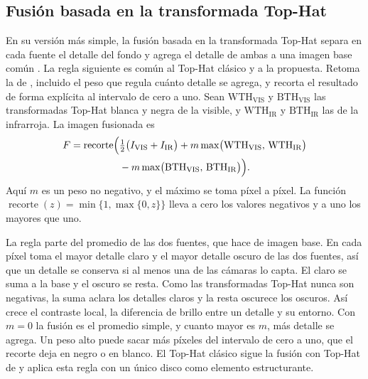 \subsection{Fusión basada en la transformada Top-Hat}
\label{sec:fusion-tophat}

En su versión más simple, la fusión basada en la transformada Top-Hat separa en cada fuente el detalle
del fondo y agrega el detalle de ambas a una imagen base común \parencite{roman2020,
ortegarodriguez2025}. La regla siguiente es común al Top-Hat clásico y a la propuesta. Retoma la de
\textcite{ortegarodriguez2025}, incluido el peso que regula cuánto detalle se agrega, y recorta el
resultado de forma explícita al intervalo de cero a uno. Sean $\mathrm{WTH}_{\mathrm{VIS}}$ y
$\mathrm{BTH}_{\mathrm{VIS}}$ las transformadas Top-Hat blanca y negra de la visible, y
$\mathrm{WTH}_{\mathrm{IR}}$ y $\mathrm{BTH}_{\mathrm{IR}}$ las de la infrarroja. La imagen fusionada es
\begin{equation} \begin{aligned} F = \operatorname{recorte}\Bigl( & \tfrac{1}{2}\bigl(I_{\mathrm{VIS}} + I_{\mathrm{IR}}\bigr)
 + m \max\bigl(\mathrm{WTH}_{\mathrm{VIS}},\, \mathrm{WTH}_{\mathrm{IR}}\bigr) \\
 & - m \max\bigl(\mathrm{BTH}_{\mathrm{VIS}},\, \mathrm{BTH}_{\mathrm{IR}}\bigr) \Bigr). \end{aligned} \label{eq:regla-tophat} \end{equation}
Aquí $m$ es un peso no negativo, y el máximo se toma píxel a píxel. La función
$\operatorname{recorte}(z) = \min\{1, \max\{0, z\}\}$ lleva a cero los valores negativos y a uno los
mayores que uno.

La regla parte del promedio de las dos fuentes, que hace de imagen base. En cada píxel toma el mayor
detalle claro y el mayor detalle oscuro de las dos fuentes, así que un detalle se conserva si al menos
una de las cámaras lo capta. El claro se suma a la base y el oscuro se resta. Como las transformadas
Top-Hat nunca son negativas, la suma aclara los detalles claros y la resta oscurece los oscuros. Así crece
el contraste local, la diferencia de brillo entre un detalle y su entorno. Con $m = 0$ la fusión es el
promedio simple, y cuanto mayor es $m$, más detalle se agrega. Un peso alto puede sacar más píxeles del
intervalo de cero a uno, que el recorte deja en negro o en blanco. El Top-Hat clásico sigue la fusión
con Top-Hat de \textcite{bajacfigueredo2024} y aplica esta regla con un único disco como elemento
estructurante.

